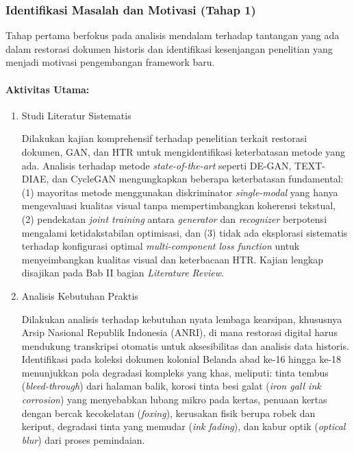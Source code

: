 \documentclass[12pt,a4paper]{book}
\begin{document}
\subsubsection{Identifikasi Masalah dan Motivasi (Tahap 1)}
Tahap pertama berfokus pada analisis mendalam terhadap tantangan yang ada dalam restorasi dokumen historis dan identifikasi kesenjangan penelitian yang menjadi motivasi pengembangan framework baru.

\paragraph{Aktivitas Utama:}

\begin{enumerate}[label=\arabic*., leftmargin=*, nosep]
\item Studi Literatur Sistematis

Dilakukan kajian komprehensif terhadap penelitian terkait restorasi dokumen, GAN, dan HTR untuk mengidentifikasi keterbatasan metode yang ada. Analisis terhadap metode \textit{state-of-the-art} seperti DE-GAN, TEXT-DIAE, dan CycleGAN mengungkapkan beberapa keterbatasan fundamental: (1) mayoritas metode menggunakan diskriminator \textit{single-modal} yang hanya mengevaluasi kualitas visual tanpa mempertimbangkan koherensi tekstual, (2) pendekatan \textit{joint training} antara \textit{generator} dan \textit{recognizer} berpotensi mengalami ketidakstabilan optimisasi, dan (3) tidak ada eksplorasi sistematis terhadap konfigurasi optimal \textit{multi-component loss function} untuk menyeimbangkan kualitas visual dan keterbacaan HTR. Kajian lengkap disajikan pada Bab II bagian \textit{Literature Review}.

\item Analisis Kebutuhan Praktis

Dilakukan analisis terhadap kebutuhan nyata lembaga kearsipan, khususnya Arsip Nasional Republik Indonesia (ANRI), di mana restorasi digital harus mendukung transkripsi otomatis untuk aksesibilitas dan analisis data historis. Identifikasi pada koleksi dokumen kolonial Belanda abad ke-16 hingga ke-18 menunjukkan pola degradasi kompleks yang khas, meliputi: tinta tembus (\textit{bleed-through}) dari halaman balik, korosi tinta besi galat (\textit{iron gall ink corrosion}) yang menyebabkan lubang mikro pada kertas, penuaan kertas dengan bercak kecokelatan (\textit{foxing}), kerusakan fisik berupa robek dan keriput, degradasi tinta yang memudar (\textit{ink fading}), dan kabur optik (\textit{optical blur}) dari proses pemindaian.


\end{enumerate}
\end{document}
